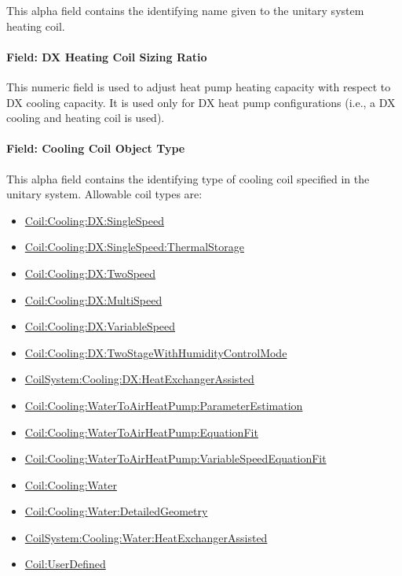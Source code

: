 This alpha field contains the identifying name given to the unitary system heating coil.

\paragraph{Field: DX Heating Coil Sizing Ratio}\label{field-dx-heating-coil-sizing-ratio}

This numeric field is used to adjust heat pump heating capacity with respect to DX cooling capacity. It is used only for DX heat pump configurations (i.e., a DX cooling and heating coil is used).

\paragraph{Field: Cooling Coil Object Type}\label{field-cooling-coil-object-type-002}

This alpha field contains the identifying type of cooling coil specified in the unitary system. Allowable coil types are:

\begin{itemize}
\item
  \hyperref[coilcoolingdxsinglespeed]{Coil:Cooling:DX:SingleSpeed}
\item
  \hyperref[coilcoolingdxsinglespeedthermalstorage]{Coil:Cooling:DX:SingleSpeed:ThermalStorage}
\item
  \hyperref[coilcoolingdxtwospeed]{Coil:Cooling:DX:TwoSpeed}
\item
  \hyperref[coilcoolingdxmultispeed]{Coil:Cooling:DX:MultiSpeed}
\item
  \hyperref[coilcoolingdxvariablespeed]{Coil:Cooling:DX:VariableSpeed}
\item
  \hyperref[coilcoolingdxtwostagewithhumiditycontrolmode]{Coil:Cooling:DX:TwoStageWithHumidityControlMode}
\item
  \hyperref[coilsystemcoolingdxheatexchangerassisted]{CoilSystem:Cooling:DX:HeatExchangerAssisted}
\item
  \hyperref[coilcoolingwatertoairheatpumpparameterestimation]{Coil:Cooling:WaterToAirHeatPump:ParameterEstimation}
\item
  \hyperref[coilcoolingwatertoairheatpumpequationfit]{Coil:Cooling:WaterToAirHeatPump:EquationFit}
\item
  \hyperref[coilcoolingwatertoairheatpumpvariablespeedequationfit]{Coil:Cooling:WaterToAirHeat\hyperref[pumpvariablespeed]{Pump:VariableSpeed}EquationFit}
\item
  \hyperref[coilcoolingwater]{Coil:Cooling:Water}
\item
  \hyperref[coilcoolingwaterdetailedgeometry]{Coil:Cooling:Water:DetailedGeometry}
\item
  \hyperref[coilsystemcoolingwaterheatexchangerassisted]{CoilSystem:Cooling:Water:HeatExchangerAssisted}
\item
  \hyperref[coiluserdefined]{Coil:UserDefined}
\end{itemize}


